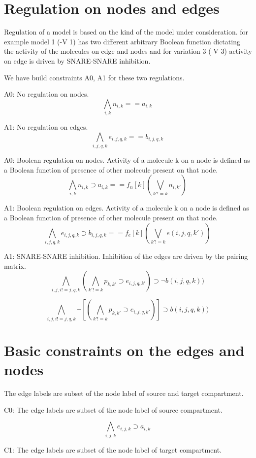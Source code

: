 \documentclass{llncs}
\begin{document}
\section{Regulation on nodes and edges}
Regulation of a model is based on the kind of the model under consideration. for example model 1 (-V 1) has two different arbitrary Boolean function dictating the activity of the molecules on edge and nodes and for variation 3 (-V 3) activity on edge is driven by SNARE-SNARE inhibition.  

We have build constraints A0, A1 for these two regulations. \newline

A0: No regulation on nodes.
\[ \bigwedge\limits_{i,k} n_{i,k} == a_{i,k} \, \]  

A1: No regulation on edges.
\[ \bigwedge\limits_{i,j,q,k} e_{i,j,q,k} == b_{i,j,q,k} \, \]  

A0: Boolean regulation on nodes. Activity of a molecule k on a node is defined as a Boolean function of presence of other molecule present on that node.
\[ \bigwedge\limits_{i,k} n_{i,k} \supset a_{i,k} ==   f_n[k] (\bigvee_{ k' != k} n_{i,k'}) \, \]  

A1: Boolean regulation on edges. Activity of a molecule k on a node is defined as a Boolean function of presence of other molecule present on that node.
\[ \bigwedge\limits_{i,j,q,k} e_{i,j,q,k} \supset b_{i,j,q,k} == f_e[k](\bigvee_{k' != k} e(i,j,q,k')) \, \]  

A1: SNARE-SNARE inhibition. Inhibition of the edges are driven by the pairing matrix.
\[ \bigwedge\limits_{i,j,i != j, q, k} (\bigwedge_{k' != k} p_{k,k'} \supset e_{i,j,q,k'}) \supset \neg b(i,j,q,k)) \, \]  

\[ \bigwedge\limits_{i,j,i != j, q, k} \neg [(\bigwedge_{k' != k} p_{k,k'} \supset e_{i,j,q,k'})] \supset b(i,j,q,k)) \, \]  

\section{Basic constraints on the edges and nodes}
The edge labels are subset of the node label of source and target compartment. \newline

C0: The edge labels are subset of the node label of source compartment.

\[ \bigwedge\limits_{i,j,k} e_{i,j,k} \supset a_{i,k} \, \]  

C1: The edge labels are subset of the node label of target compartment.
\end{document}
